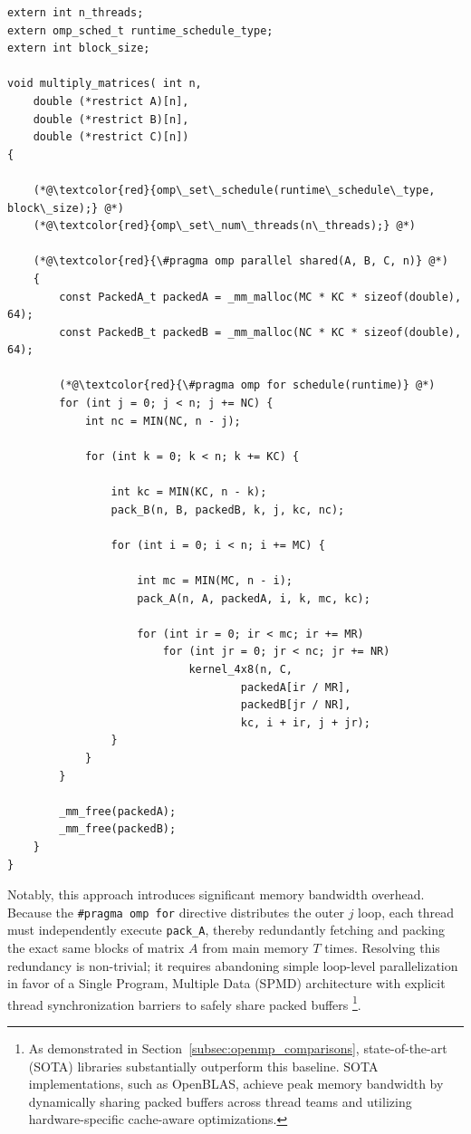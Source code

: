 \begin{lstlisting}[style=CStyle, caption={Blas-like implementation with OpenMP directives}, label={lst:blas_like_openmp}]
extern int n_threads;
extern omp_sched_t runtime_schedule_type;
extern int block_size;

void multiply_matrices( int n, 
    double (*restrict A)[n], 
    double (*restrict B)[n], 
    double (*restrict C)[n]) 
{
    
    (*@\textcolor{red}{omp\_set\_schedule(runtime\_schedule\_type, block\_size);} @*)
    (*@\textcolor{red}{omp\_set\_num\_threads(n\_threads);} @*)    
    
    (*@\textcolor{red}{\#pragma omp parallel shared(A, B, C, n)} @*)   
    {
        const PackedA_t packedA = _mm_malloc(MC * KC * sizeof(double), 64);
        const PackedB_t packedB = _mm_malloc(NC * KC * sizeof(double), 64);

        (*@\textcolor{red}{\#pragma omp for schedule(runtime)} @*)   
        for (int j = 0; j < n; j += NC) {
            int nc = MIN(NC, n - j);
            
            for (int k = 0; k < n; k += KC) {
            
                int kc = MIN(KC, n - k);                
                pack_B(n, B, packedB, k, j, kc, nc);  
                
                for (int i = 0; i < n; i += MC) {
                
                    int mc = MIN(MC, n - i);                    
                    pack_A(n, A, packedA, i, k, mc, kc);
                    
                    for (int ir = 0; ir < mc; ir += MR)
                        for (int jr = 0; jr < nc; jr += NR)
                            kernel_4x8(n, C,
                                    packedA[ir / MR],
                                    packedB[jr / NR],
                                    kc, i + ir, j + jr);
                }
            }
        }

        _mm_free(packedA);
        _mm_free(packedB);
    }
}
\end{lstlisting}

Notably, this approach introduces significant memory bandwidth overhead. Because the \texttt{\#pragma omp for} directive distributes the outer $j$ loop, each thread must independently execute \texttt{pack\_A}, thereby redundantly fetching and packing the exact same blocks of matrix $A$ from main memory $T$ times. Resolving this redundancy is non-trivial; it requires abandoning simple loop-level parallelization in favor of a Single Program, Multiple Data (SPMD) architecture with explicit thread synchronization barriers to safely share packed buffers \footnote{As demonstrated in Section~\ref{subsec:openmp_comparisons}, state-of-the-art (SOTA) libraries substantially outperform this baseline. SOTA implementations, such as OpenBLAS, achieve peak memory bandwidth by dynamically sharing packed buffers across thread teams and utilizing hardware-specific cache-aware optimizations.}. 

